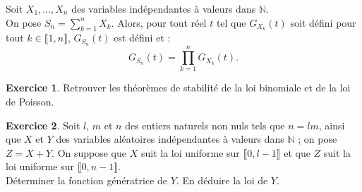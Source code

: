 \documentclass[french]{article}
\newcommand{\N}{\mathbb{N}}
\theoremstyle{plain}
\theoremstyle{definition}
\newtheorem{exo}{Exercice}
\theoremstyle{remark}
\begin{document}
\begin{thm}{}%
	Soit $X_1,\ldots,X_n$ des variables indépendantes à valeurs dans $\N$.\\
	On pose $S_n=\displaystyle\sum_{k=1}^{n}X_k$. Alors, pour tout réel $t$ tel que $G_{X_k}(t)$ soit défini pour tout $k\in\llbracket1,n\rrbracket$, $G_{S_n}(t)$ est défini et : 
	$$G_{S_n}(t)=\prod_{k=1}^{n}G_{X_k}(t).$$
\end{thm}

\begin{exo}
	Retrouver les théorèmes de stabilité de la loi binomiale et de la loi de Poisson.
\end{exo}

\begin{exo}
	Soit $l$, $m$ et $n$ des entiers naturels non nuls tels que $n=lm$, ainsi que $X$ et $Y$ des variables aléatoires indépendantes à valeurs dans $\N$ ; on pose $Z=X+Y$. On suppose que $X$ suit la loi uniforme sur $\llbracket0,l-1\rrbracket$ et que $Z$ suit la loi uniforme sur $\llbracket0,n-1\rrbracket$.\\
	Déterminer la fonction génératrice de $Y$. En déduire la loi de $Y$.
\end{exo}
\end{document}
